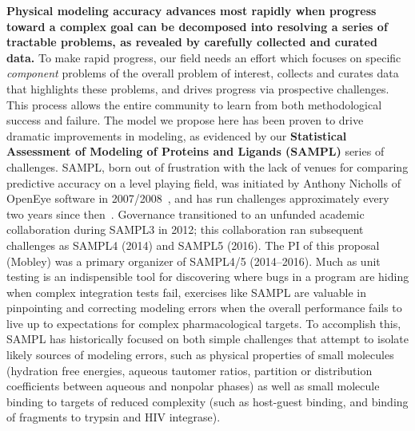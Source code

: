\documentclass[11pt]{article}
\begin{document}
\textbf{Physical modeling accuracy advances most rapidly when progress toward a complex goal can be decomposed into resolving a series of tractable problems, as revealed by carefully collected and curated data.}
To make rapid progress, our field needs an effort which focuses on specific \emph{component} problems of the overall problem of interest, collects and curates data that highlights these problems, and drives progress via prospective challenges.
This process allows the entire community to learn from both methodological success and failure. 
The model we propose here has been proven to drive dramatic improvements in modeling, as evidenced by our {\bf Statistical Assessment of Modeling of Proteins and Ligands (SAMPL)} series of challenges. 
SAMPL, born out of frustration with the lack of venues for comparing predictive accuracy on a level playing field, was initiated by Anthony Nicholls of OpenEye software in 2007/2008~\cite{nicholls_predicting_2008}, and has run challenges approximately every two years since then~\cite{nicholls_samp1_2009, mobley_predictions_2009, geballe_sampl2_2010, geballe_sampl3_2012, mobley_blind_2014-1, muddana_sampl4_2014, bannan_blind_2016, yin_overview_2016}.
Governance transitioned to an unfunded academic collaboration during SAMPL3 in 2012; this collaboration ran subsequent challenges as SAMPL4 (2014) and SAMPL5 (2016).
The PI of this proposal (Mobley) was a primary organizer of SAMPL4/5 (2014--2016).
Much as unit testing is an indispensible tool for discovering where bugs in a program are hiding when complex integration tests fail, exercises like SAMPL are valuable in pinpointing and correcting modeling errors when the overall performance fails to live up to expectations for complex pharmacological targets.
To accomplish this, SAMPL has historically focused on both simple challenges that attempt to isolate likely sources of modeling errors, such as physical properties of small molecules (hydration free energies, aqueous tautomer ratios, partition or distribution coefficients between aqueous and nonpolar phases) as well as small molecule binding to targets of reduced complexity (such as host-guest binding, and binding of fragments to trypsin and HIV integrase).
\end{document}
